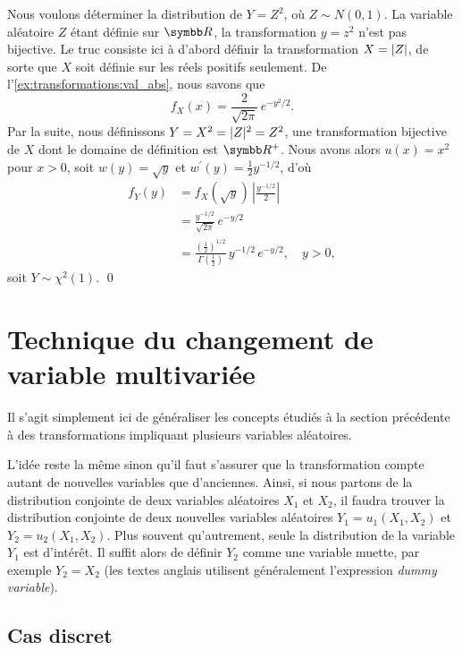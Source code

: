 \begin{exemple}
  Nous voulons déterminer la distribution de $Y = Z^2$, où $Z \sim
  N(0, 1)$. La variable aléatoire $Z$ étant définie sur
  $\R$, la transformation $y = z^2$ n'est pas bijective. Le truc
  consiste ici à d'abord définir la transformation $X = \lvert Z \rvert$, de
  sorte que $X$ soit définie sur les réels positifs seulement. De
  l'\autoref{ex:transformations:val_abs}, nous savons que
  \begin{displaymath}
    f_X(x) = \frac{2}{\sqrt{2\pi}}\, e^{-y^2/2}.
  \end{displaymath}
  Par la suite, nous définissons $Y = X^2 = \lvert Z \rvert^2 = Z^2$, une
  transformation bijective de $X$ dont le domaine de définition est
  $\R^+$. Nous avons alors $u(x) = x^2$ pour $x > 0$, soit $w(y) = \sqrt{y}$
  et $w^\prime(y) = \frac{1}{2} y^{-1/2}$, d'où
  \begin{align*}
    f_Y(y)
    &= f_X(\sqrt{y})\,
    \left|
      \frac{y^{-1/2}}{2}
    \right| \\
    &= \frac{y^{-1/2}}{\sqrt{2\pi}}\, e^{-y/2} \\
    &= \frac{(\frac{1}{2})^{1/2}}{\Gamma(\frac{1}{2})}\, y^{-1/2}\,
    e^{-y/2}, \quad y > 0,
  \end{align*}
  soit $Y \sim \chi^2(1)$.
  \qed
\end{exemple}


\section{Technique du changement de variable multivariée}

Il s'agit simplement ici de généraliser les concepts étudiés à la
section précédente à des transformations impliquant plusieurs
variables aléatoires.

L'idée reste la même sinon qu'il faut s'assurer que la transformation
compte autant de nouvelles variables que d'anciennes. Ainsi, si
nous partons de la distribution conjointe de deux variables aléatoires
$X_1$ et $X_2$, il faudra trouver la distribution conjointe de deux
nouvelles variables aléatoires $Y_1 = u_1(X_1, X_2)$ et $Y_2 =
u_2(X_1, X_2)$. Plus souvent qu'autrement, seule la distribution de la
variable $Y_1$ est d'intérêt. Il suffit alors de définir $Y_2$ comme
une variable muette, par exemple $Y_2 = X_2$ (les textes anglais
utilisent généralement l'expression \emph{dummy variable}).

\subsection{Cas discret}

